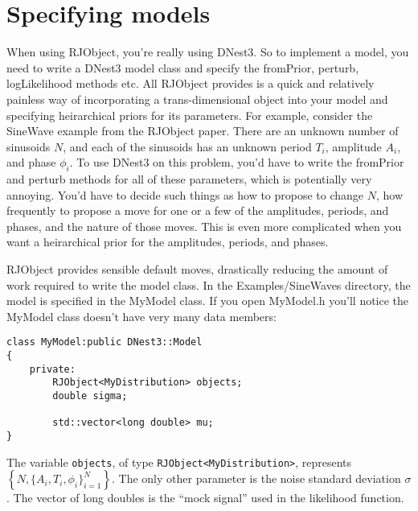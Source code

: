 \documentclass[a4paper, 11pt]{article}
\begin{document}
\section{Specifying models}
When using RJObject, you're really using DNest3. So to implement a model, you
need to write a DNest3 model class and specify the fromPrior, perturb,
logLikelihood methods etc. All RJObject provides is a quick and relatively
painless way of incorporating a trans-dimensional object into your model and
specifying heirarchical priors for its parameters. For example, consider
the SineWave example from the RJObject paper. There are an unknown number of
sinusoids $N$, and each of the sinusoids has an unknown period $T_i$, amplitude
$A_i$, and phase $\phi_i$. To use DNest3 on this problem, you'd have to write
the fromPrior and perturb methods for all of these parameters, which is
potentially very annoying. You'd have to decide such things as how to propose
to change $N$, how frequently to propose a move for one or a few of the
amplitudes, periods, and phases, and the nature of those moves. This is even
more complicated when you want a heirarchical prior for the amplitudes, periods,
and phases.

RJObject provides sensible default moves, drastically reducing the amount of
work required to write the model class. In the Examples/SineWaves directory,
the model is specified in the MyModel class. If you open MyModel.h you'll
notice the MyModel class doesn't have very many data members:

\begin{framed}
\begin{verbatim}
class MyModel:public DNest3::Model
{
    private:
        RJObject<MyDistribution> objects;
        double sigma;

        std::vector<long double> mu;
}
\end{verbatim}
\end{framed}

The variable {\tt objects}, of type {\tt RJObject<MyDistribution>}, represents
$\left\{N, \{A_i, T_i, \phi_i\}_{i=1}^N\right\}$. The only other parameter
is the noise standard deviation $\sigma$. The vector of long doubles is
the ``mock signal'' used in the likelihood function.
\end{document}
